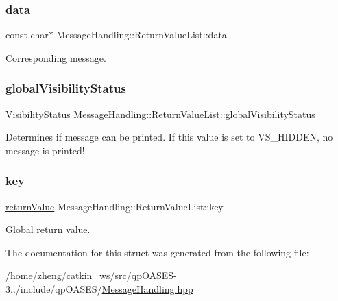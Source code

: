 \subsubsection{\texorpdfstring{data}{data}}
{\footnotesize\ttfamily const char$\ast$ Message\+Handling\+::\+Return\+Value\+List\+::data}

Corresponding message. \mbox{\label{struct_message_handling_1_1_return_value_list_afb06de1c22ce41511753923ea8fa7542}} 
\subsubsection{\texorpdfstring{global\+Visibility\+Status}{globalVisibilityStatus}}
{\footnotesize\ttfamily \hyperlink{_types_8hpp_a36503475bb1fea0a7fd7087259ee63c1}{Visibility\+Status} Message\+Handling\+::\+Return\+Value\+List\+::global\+Visibility\+Status}

Determines if message can be printed. If this value is set to V\+S\+\_\+\+H\+I\+D\+D\+EN, no message is printed! \mbox{\label{struct_message_handling_1_1_return_value_list_ad1a32761233ddf33b534717291c07cc0}} 
\subsubsection{\texorpdfstring{key}{key}}
{\footnotesize\ttfamily \hyperlink{_message_handling_8hpp_a81d556f613bfbabd0b1f9488c0fa865e}{return\+Value} Message\+Handling\+::\+Return\+Value\+List\+::key}

Global return value. 

The documentation for this struct was generated from the following file\+:\begin{DoxyCompactItemize}
\item 
/home/zheng/catkin\+\_\+ws/src/qp\+O\+A\+S\+E\+S-\/3../include/qp\+O\+A\+S\+E\+S/\hyperlink{_message_handling_8hpp}{Message\+Handling.\+hpp}\end{DoxyCompactItemize}
